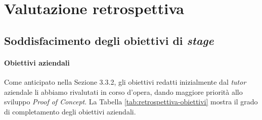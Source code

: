 \chapter{Valutazione retrospettiva}
    \section{Soddisfacimento degli obiettivi di \textit{stage}}
        \subsubsection{Obiettivi aziendali}
        Come anticipato nella Sezione 3.3.2, gli obiettivi redatti inizialmente dal \textit{tutor} aziendale li abbiamo rivalutati in corso d'opera, dando maggiore priorità allo sviluppo \textit{Proof of Concept}. La Tabella \ref{tab:retrospettiva-obiettivi} mostra il grado di completamento degli obiettivi aziendali. 

